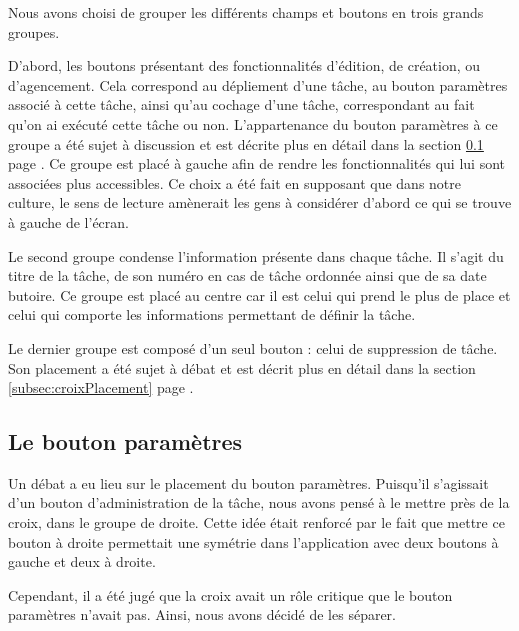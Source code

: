 \documentclass[11pt]{article}
\begin{document}
Nous avons choisi de grouper les différents champs et boutons en trois
grands groupes. 

D'abord, les boutons présentant des fonctionnalités
d'édition, de création, ou d'agencement. Cela correspond au dépliement
d'une tâche, au bouton paramètres associé à cette tâche, ainsi qu'au
cochage d'une tâche, correspondant au fait qu'on ai exécuté cette
tâche ou non. L'appartenance du bouton paramètres à ce groupe a été
sujet à discussion et est décrite plus en détail dans la section
\ref{subsec:paramPlacement} page \pageref{subsec:paramPlacement}. Ce
groupe est placé à gauche afin de rendre les fonctionnalités qui lui
sont associées plus accessibles. Ce choix a été fait en supposant que
dans notre culture, le sens de lecture amènerait les gens à considérer
d'abord ce qui se trouve à gauche de l'écran.

Le second groupe condense l'information présente dans chaque tâche. Il
s'agit du titre de la tâche, de son numéro en cas de tâche ordonnée
ainsi que de sa date butoire. Ce groupe est placé au centre car il est
celui qui prend le plus de place et celui qui comporte les
informations permettant de définir la tâche.

Le dernier groupe est composé d'un seul bouton : celui de suppression
de tâche. Son placement a été sujet à débat et est décrit plus en
détail dans la section \ref{subsec:croixPlacement} page
\pageref{subsec:croixPlacement}.



\subsection{Le bouton paramètres}
\label{subsec:paramPlacement}

Un débat a eu lieu sur le placement du bouton paramètres. Puisqu'il
s'agissait d'un bouton d'administration de la tâche, nous avons pensé
à le mettre près de la croix, dans le groupe de droite. Cette idée
était renforcé par le fait que mettre ce bouton à droite permettait
une symétrie dans l'application avec deux boutons à gauche et deux à
droite.

Cependant, il a été jugé que la croix avait un rôle critique que le
bouton paramètres n'avait pas. Ainsi, nous avons décidé de les
séparer.
\end{document}
